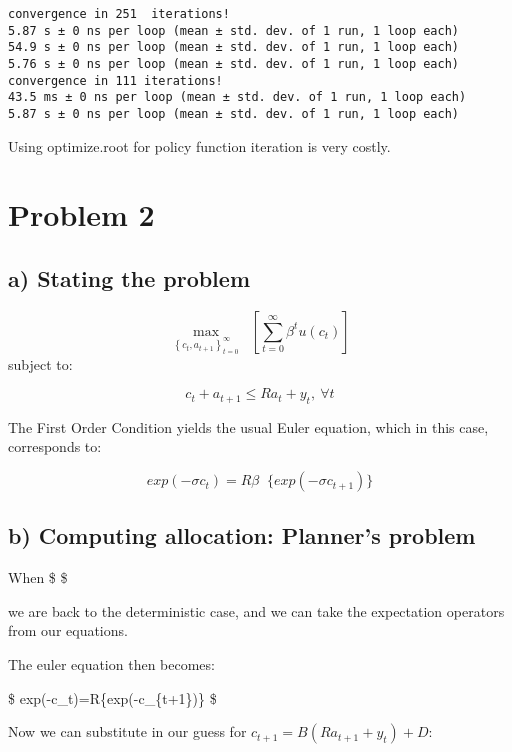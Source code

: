 \documentclass[11pt]{article}
\begin{document}
    \begin{Verbatim}[commandchars=\\\{\}]
convergence in 251  iterations!
5.87 s ± 0 ns per loop (mean ± std. dev. of 1 run, 1 loop each)
54.9 s ± 0 ns per loop (mean ± std. dev. of 1 run, 1 loop each)
5.76 s ± 0 ns per loop (mean ± std. dev. of 1 run, 1 loop each)
convergence in 111 iterations!
43.5 ms ± 0 ns per loop (mean ± std. dev. of 1 run, 1 loop each)
5.87 s ± 0 ns per loop (mean ± std. dev. of 1 run, 1 loop each)
    \end{Verbatim}

    Using optimize.root for policy function iteration is very costly.

    \hypertarget{problem-2}{%
\section{Problem 2}\label{problem-2}}

    \hypertarget{a-stating-the-problem}{%
\subsection{a) Stating the problem}\label{a-stating-the-problem}}

\[
\max_{\left\{c_t, a_{t+1}\right\}_{t=0}^\infty} \mathop{E_0}  \left[\sum_{t=0}^{\infty} \beta^t u(c_t)\right]
\] subject to:

\[
c_t+a_{t+1}\leq Ra_t+y_t,\ \forall t
\]

The First Order Condition yields the usual Euler equation, which in this
case, corresponds to:

\[
exp(-\sigma c_t)=R\beta \mathop{E_t}\{exp(-\sigma c_{t+1})\}
\]

    \hypertarget{b-computing-allocation-planners-problem}{%
\subsection{b) Computing allocation: Planner's
problem}\label{b-computing-allocation-planners-problem}}

When \$  \$

we are back to the deterministic case, and we can take the expectation
operators from our equations.

The euler equation then becomes:

\$ exp(-\sigma c\_t)=R\beta \{exp(-\sigma c\_\{t+1\})\} \$

Now we can substitute in our guess for \(c_{t+1}=B(Ra_{t+1}+y_{t})+D\):
\end{document}
